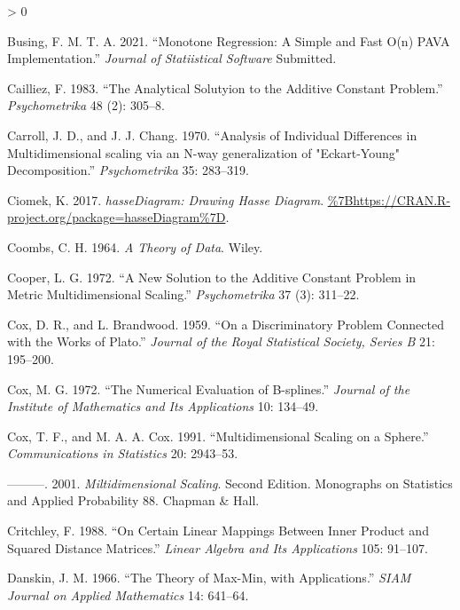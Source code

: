 \documentclass[
  12pt,
]{book}
\newlength{\cslhangindent}
\newenvironment{CSLReferences}[2] %
 {%
  \setlength{\parindent}{0pt}
  \ifodd #1 \everypar{\setlength{\hangindent}{\cslhangindent}}\ignorespaces\fi
  \ifnum #2 > 0
  \setlength{\parskip}{#2\baselineskip}
  \fi
 }%
 {}
\theoremstyle{definition}
\theoremstyle{definition}
\theoremstyle{definition}
\theoremstyle{definition}
\theoremstyle{remark}
\begin{document}
\begin{CSLReferences}{1}{0}
\leavevmode\hypertarget{ref-busing_21}{}%
Busing, F. M. T. A. 2021. {``{Monotone Regression: A Simple and Fast O(n) PAVA Implementation}.''} \emph{Journal of Statiistical Software} Submitted.

\leavevmode\hypertarget{ref-cailliez_83}{}%
Cailliez, F. 1983. {``{The Analytical Solutyion to the Additive Constant Problem}.''} \emph{Psychometrika} 48 (2): 305--8.

\leavevmode\hypertarget{ref-carroll_chang_70}{}%
Carroll, J. D., and J. J. Chang. 1970. {``{Analysis of Individual Differences in Multidimensional scaling via an N-way generalization of "Eckart-Young" Decomposition.}''} \emph{Psychometrika} 35: 283--319.

\leavevmode\hypertarget{ref-ciomek_17}{}%
Ciomek, K. 2017. \emph{{hasseDiagram: Drawing Hasse Diagram}}. \url{\%7Bhttps://CRAN.R-project.org/package=hasseDiagram\%7D}.

\leavevmode\hypertarget{ref-coombs_64}{}%
Coombs, C. H. 1964. \emph{{A Theory of Data}}. Wiley.

\leavevmode\hypertarget{ref-cooper_72}{}%
Cooper, L. G. 1972. {``{A New Solution to the Additive Constant Problem in Metric Multidimensional Scaling}.''} \emph{Psychometrika} 37 (3): 311--22.

\leavevmode\hypertarget{ref-cox_brandwood_59}{}%
Cox, D. R., and L. Brandwood. 1959. {``{On a Discriminatory Problem Connected with the Works of Plato}.''} \emph{Journal of the Royal Statistical Society, Series B} 21: 195--200.

\leavevmode\hypertarget{ref-cox_72}{}%
Cox, M. G. 1972. {``{The Numerical Evaluation of B-splines}.''} \emph{Journal of the Institute of Mathematics and Its Applications} 10: 134--49.

\leavevmode\hypertarget{ref-cox_cox_91}{}%
Cox, T. F., and M. A. A. Cox. 1991. {``{Multidimensional Scaling on a Sphere}.''} \emph{Communications in Statistics} 20: 2943--53.

\leavevmode\hypertarget{ref-cox_cox_01}{}%
---------. 2001. \emph{Miltidimensional Scaling}. Second Edition. Monographs on Statistics and Applied Probability 88. Chapman \& Hall.

\leavevmode\hypertarget{ref-critchley_88}{}%
Critchley, F. 1988. {``{On Certain Linear Mappings Between Inner Product and Squared Distance Matrices}.''} \emph{Linear Algebra and Its Applications} 105: 91--107.

\leavevmode\hypertarget{ref-danskin_66}{}%
Danskin, J. M. 1966. {``{The Theory of Max-Min, with Applications}.''} \emph{{SIAM} Journal on Applied Mathematics} 14: 641--64.


\end{CSLReferences}
\end{document}
